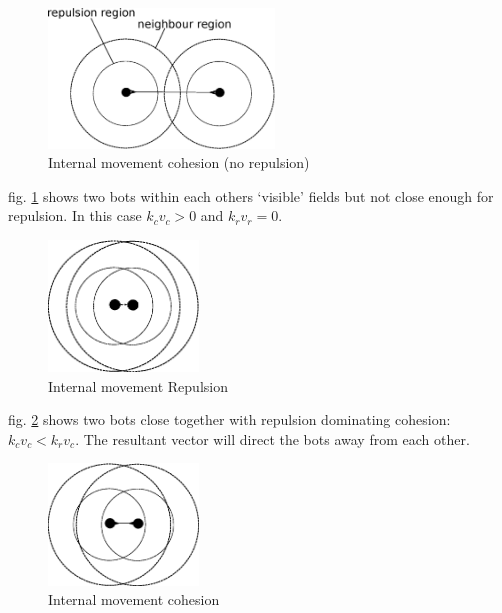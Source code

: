 \documentclass[10pt,journal,letterpaper,twoside]{IEEEtran}
\newcommand{\Stability}{Internal movement}
\newcommand{\Fig}{fig.}
\begin{document}
\begin{figure}[H]
\begin{center}
\includegraphics[width=6cm]{figures/Stability1}
\end{center}
\caption{\Stability{} cohesion (no repulsion)} \label{methods:Stability1}
\end{figure}

\Fig{} \ref{methods:Stability1} shows two bots within each others
`visible' fields but not close enough for repulsion.  In this case
$k_cv_c > 0$ and $k_rv_r = 0$.

\begin{figure}[H]
\begin{center}
\includegraphics[width=4cm]{figures/Stability2}
\end{center}
\caption{\Stability{} Repulsion} \label{methods:Stability2}
\end{figure}

\Fig{} \ref{methods:Stability2} shows two bots close together with
repulsion dominating cohesion: $k_cv_c < k_rv_c$. The resultant vector
will direct the bots away from each other.

\begin{figure}[H]
\begin{center}
\includegraphics[width=4cm]{figures/Stability3}
\end{center}
\caption{\Stability{} cohesion} \label{methods:Stability3}
\end{figure}
\end{document}

